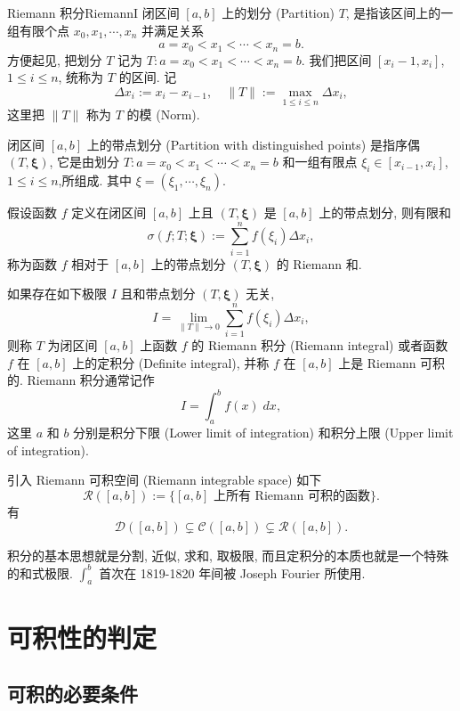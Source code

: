 \documentclass[cn,toc=twocol]{elegantbook}
\newcommand{\D}{\mathscr{D}}
\newcommand{\ve}[1]{\boldsymbol{#1}}
\begin{document}
\begin{definition}{Riemann 积分}{RiemannI}
	闭区间 $[a,b]$ 上的划分 (Partition) $T$, 是指该区间上的一组有限个点 $x_0,x_1, \cdots, x_n$ 并满足关系 
	\[
		a= x_0 < x_1 < \cdots <x_n = b.
	\]
方便起见, 把划分 $T$ 记为 $T : a = x_0 < x_1 < \cdots < x_n = b$. 我们把区间 $[x_i - 1,x_i]$, $1 \le i \le n$, 统称为 $T$ 的区间. 记
\[
	\Delta x_i := x_i - x_{i-1},\quad \lVert T \rVert := \max_{1\le i \le n} \Delta x_i,
\]
这里把 $\lVert T \rVert$ 称为 $T$ 的模 (Norm).
\smallskip

闭区间 $[a,b]$ 上的带点划分 (Partition with distinguished points) 是指序偶 $(T,\ve\xi)$, 它是由划分 $T : a= x_0 <x_1 < \cdots < x_n = b$ 和一组有限点 $\xi_i \in [x_{i-1},x_i]$, $1 \le i \le n$,所组成. 其中 $\xi = (\xi_1,\cdots,\xi_n)$.
\smallskip

假设函数 $f$ 定义在闭区间 $[a,b]$ 上且 $(T,\ve\xi)$ 是 $[a,b]$ 上的带点划分, 则有限和
\[
	\sigma(f; T; \ve{\xi}) := \sum_{i=1}^n f(\xi_i)\Delta x_i,
\]
称为函数 $f$ 相对于 $[a,b]$ 上的带点划分 $(T,\ve\xi)$ 的 Riemann 和.
\smallskip

如果存在如下极限 $I$ 且和带点划分 $(T,\ve\xi)$ 无关,
\[
	I = \lim_{\lVert T \rVert \to 0} \sum_{i=1}^n f(\xi_i)\Delta x_i,
\]
则称 $T$ 为闭区间 $[a,b]$ 上函数 $f$ 的 Riemann 积分 (Riemann integral) 或者函数 $f$ 在 $[a,b]$ 上的定积分 (Definite integral), 并称 $f$ 在 $[a,b]$ 上是 Riemann 可积的. Riemann 积分通常记作
\[
	I = \int_a^b f(x)\; dx,
\]
这里 $a$ 和 $b$ 分别是积分下限 (Lower limit of integration) 和积分上限 (Upper limit of integration).
\smallskip

引入 Riemann 可积空间 (Riemann integrable space) 如下
\[
	\mathscr{R}([a,b]) := \{\text{$[a,b]$ 上所有 Riemann 可积的函数}\}.
\]
有
\[
	\D([a,b]) \subsetneq \mathscr{C}([a,b]) \subsetneq \mathscr{R}([a,b]).
\]
\end{definition}

\begin{remark}
	积分的基本思想就是分割, 近似, 求和, 取极限, 而且定积分的本质也就是一个特殊的和式极限. $\int_a^b$ 首次在 1819-1820 年间被 Joseph Fourier 所使用.
\end{remark}


\section{可积性的判定}

\subsection{可积的必要条件}
\end{document}

